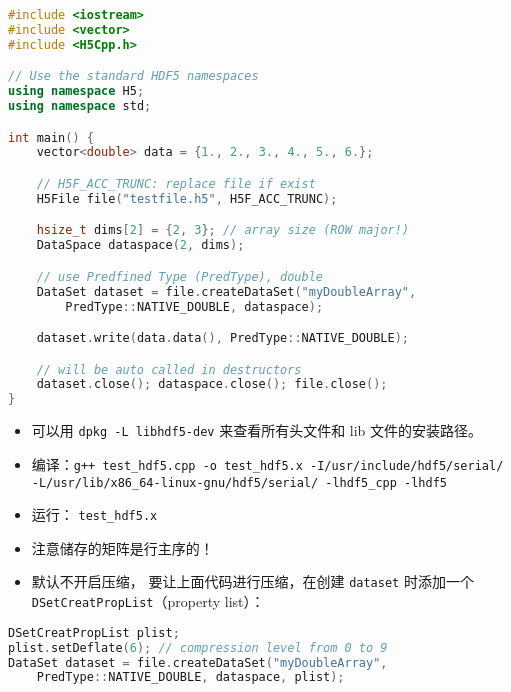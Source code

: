 \begin{lstlisting}[language=cpp,caption=test\_hdf5.cpp]
#include <iostream>
#include <vector>
#include <H5Cpp.h>

// Use the standard HDF5 namespaces
using namespace H5;
using namespace std;

int main() {
	vector<double> data = {1., 2., 3., 4., 5., 6.};

	// H5F_ACC_TRUNC: replace file if exist
	H5File file("testfile.h5", H5F_ACC_TRUNC);

	hsize_t dims[2] = {2, 3}; // array size (ROW major!)
	DataSpace dataspace(2, dims);

	// use Predfined Type (PredType), double
	DataSet dataset = file.createDataSet("myDoubleArray",
		PredType::NATIVE_DOUBLE, dataspace);

	dataset.write(data.data(), PredType::NATIVE_DOUBLE);

	// will be auto called in destructors
	dataset.close(); dataspace.close(); file.close();
}
\end{lstlisting}
\begin{itemize}
\item 可以用 \verb|dpkg -L libhdf5-dev| 来查看所有头文件和 lib 文件的安装路径。
\item 编译：\verb|g++ test_hdf5.cpp -o test_hdf5.x -I/usr/include/hdf5/serial/ -L/usr/lib/x86_64-linux-gnu/hdf5/serial/ -lhdf5_cpp -lhdf5|
\item 运行： \verb|test_hdf5.x|
\item 注意储存的矩阵是行主序的！
\item 默认不开启压缩， 要让上面代码进行压缩，在创建 \verb|dataset| 时添加一个 \verb|DSetCreatPropList|（property list）：
\end{itemize}
\begin{lstlisting}[language=cpp]
DSetCreatPropList plist;
plist.setDeflate(6); // compression level from 0 to 9
DataSet dataset = file.createDataSet("myDoubleArray",
	PredType::NATIVE_DOUBLE, dataspace, plist);
\end{lstlisting}
